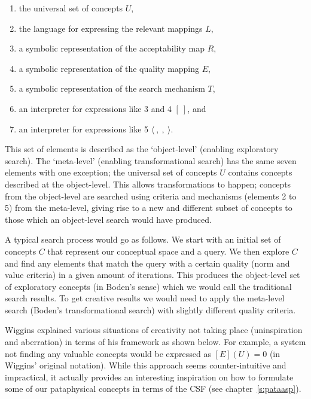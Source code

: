\begin{enumerate}
	\item the universal set of concepts $U$,
	\item the language for expressing the relevant mappings $L$,
	\item a symbolic representation of the acceptability map $R$,
	\item a symbolic representation of the quality mapping $E$,
  \item a symbolic representation of the search mechanism $T$,
	\item an interpreter for expressions like 3 and 4 $[ \ ]$, and
	\item an interpreter for expressions like 5 $\langle \ , \ , \ \rangle$.
\end{enumerate}

This set of elements is described as the `object-level' (enabling exploratory search). The `meta-level' (enabling transformational search) has the same seven elements with one exception; the universal set of concepts $U$ contains concepts described at the object-level. This allows transformations to happen; concepts from the object-level are searched using criteria and mechanisms (elements 2 to 5) from the meta-level, giving rise to a new and different subset of concepts to those which an object-level search would have produced.

A typical search process would go as follows. We start with an initial set of concepts $C$ that represent our conceptual space and a query. We then explore $C$ and find any elements that match the query with a certain quality (norm and value criteria) in a given amount of iterations. This produces the object-level set of exploratory concepts (in Boden's sense) which we would call the traditional search results. To get creative results we would need to apply the meta-level search (Boden's transformational search) with slightly different quality criteria.

Wiggins explained various situations of creativity not taking place (uninspiration and aberration) in terms of his framework as shown below. For example, a system not finding any valuable concepts would be expressed as $[E](U) = 0$ (in Wiggins' original notation). While this approach seems counter-intuitive and impractical, it actually provides an interesting inspiration on how to formulate some of our pataphysical concepts in terms of the \ac{CSF} (see chapter~\ref{s:pataasp}).


